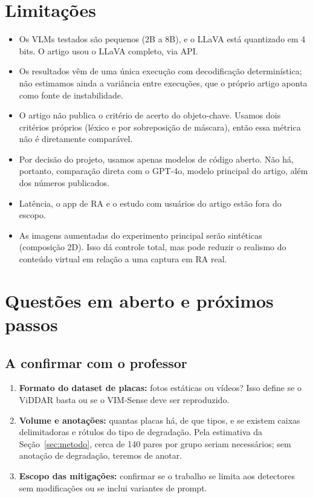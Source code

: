 \documentclass[journal,onecolumn]{IEEEtran}
\begin{document}
\section{Limitações}
\begin{itemize}
\item Os VLMs testados são pequenos (2B a 8B), e o LLaVA está quantizado em 4 bits. O artigo usou o
  LLaVA completo, via API.
\item Os resultados vêm de uma única execução com decodificação determinística; não estimamos ainda a
  variância entre execuções, que o próprio artigo aponta como fonte de instabilidade.
\item O artigo não publica o critério de acerto do objeto-chave. Usamos dois critérios próprios
  (léxico e por sobreposição de máscara), então essa métrica não é diretamente comparável.
\item Por decisão do projeto, usamos apenas modelos de código aberto. Não há, portanto, comparação
  direta com o GPT-4o, modelo principal do artigo, além dos números publicados.
\item Latência, o app de RA e o estudo com usuários do artigo estão fora do escopo.
\item As imagens aumentadas do experimento principal serão sintéticas (composição 2D). Isso dá
  controle total, mas pode reduzir o realismo do conteúdo virtual em relação a uma captura em RA real.
\end{itemize}

\section{Questões em aberto e próximos passos}
\label{sec:aberto}

\subsection{A confirmar com o professor}
\begin{enumerate}
\item \textbf{Formato do dataset de placas:} fotos estáticas ou vídeos? Isso define se o ViDDAR basta
  ou se o VIM-Sense deve ser reproduzido.
\item \textbf{Volume e anotações:} quantas placas há, de que tipos, e se existem caixas delimitadoras
  e rótulos do tipo de degradação. Pela estimativa da Seção~\ref{sec:metodo}, cerca de 140 pares por
  grupo seriam necessários; sem anotação de degradação, teremos de anotar.
\item \textbf{Escopo das mitigações:} confirmar se o trabalho se limita aos detectores sem
  modificações ou se inclui variantes de prompt.
\end{enumerate}
\end{document}
